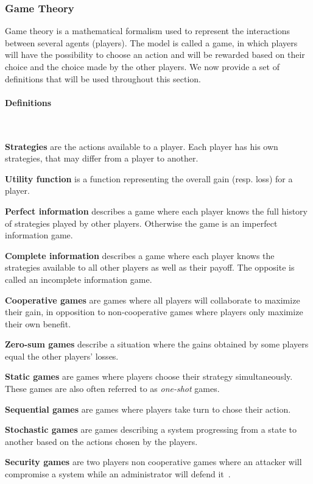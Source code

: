 \subsubsection{Game Theory}

Game theory is a mathematical formalism used to represent the interactions between several agents (\ie players).
The model is called a game, in which players will have the possibility to choose an action and will be rewarded based on their choice and the choice made by the other players.
We now provide a set of definitions that will be used throughout this section.

\paragraph{Definitions}\textbf{\\}

\textbf{Strategies} are the actions available to a player. Each player has his own strategies, that may differ from a player to another.

\textbf{Utility function} is a function representing the overall gain (resp. loss) for a player.

\textbf{Perfect information} describes a game where each player knows the full history of strategies played by other players. Otherwise the game is an imperfect information game.

\textbf{Complete information} describes a game where each player knows the strategies available to all other players as well as their payoff. The opposite is called an incomplete information game.

\textbf{Cooperative games} are games where all players will collaborate to maximize their gain, in opposition to non-cooperative games where players only maximize their own benefit.

\textbf{Zero-sum games} describe a situation where the gains obtained by some players equal the other players' losses.

\textbf{Static games} are games where players choose their strategy simultaneously. These games are also often referred to as \textit{one-shot} games.

\textbf{Sequential games} are games where players take turn to chose their action.

\textbf{Stochastic games} are games describing a system progressing from a state to another based on the actions chosen by the players.

\textbf{Security games} are two players non cooperative games where an attacker will compromise a system while an administrator will defend it~\cite{book-gt}.


